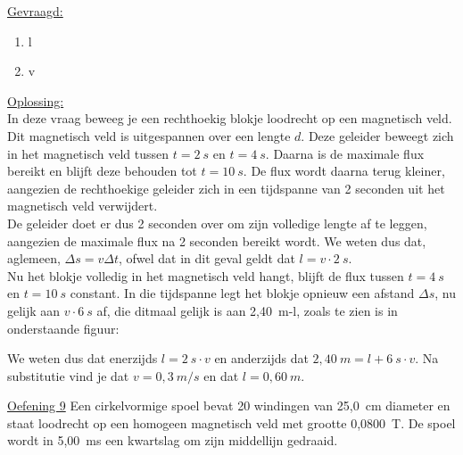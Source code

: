 \documentclass[a4paper,12pt,twoside]{article}%
\begin{document}
\underline{Gevraagd:}
\begin{enumerate}
	\item l
	\item v
\end{enumerate} 
\underline{Oplossing:}\\
In deze vraag beweeg je een rechthoekig blokje loodrecht op een magnetisch veld. Dit magnetisch veld is uitgespannen over een lengte $d$. Deze geleider beweegt zich in het magnetisch veld tussen $t=2~s$ en  $t=4~s$. Daarna is de maximale flux bereikt en blijft deze behouden tot $t= 10~s$. De flux wordt daarna terug kleiner, aangezien de rechthoekige geleider zich in een tijdspanne van 2 seconden uit het magnetisch veld verwijdert. \\
De geleider doet er dus 2 seconden over om zijn volledige lengte af te leggen, aangezien de maximale flux na 2 seconden bereikt wordt. We weten dus dat, aglemeen, $\Delta s = v\Delta t$, ofwel dat in dit geval geldt dat $l = v\cdot 2~s$.\\
Nu het blokje volledig in het magnetisch veld hangt, blijft de flux tussen $t=4~s$ en $t=10~s$ constant. In die tijdspanne legt het blokje opnieuw een afstand $\Delta s$, nu gelijk aan $v\cdot 6~s$ af, die ditmaal gelijk is aan 2,40~m-l, zoals te zien is in onderstaande figuur:
\begin{figure}[!h]
	\centering
\end{figure}
We weten dus dat enerzijds $l = 2~s\cdot v$ en anderzijds dat $2,40~m=l+6~s\cdot v$. Na substitutie vind je dat $v = 0,3~m/s$ en dat $l=0,60~m$.
\newpage


\underline{Oefening 9}
Een cirkelvormige spoel bevat 20 windingen van 25,0~cm diameter en staat loodrecht op een homogeen magnetisch veld met grootte 0,0800~T. De spoel wordt in 5,00~ms een kwartslag om zijn middellijn gedraaid.\\
\end{document}
